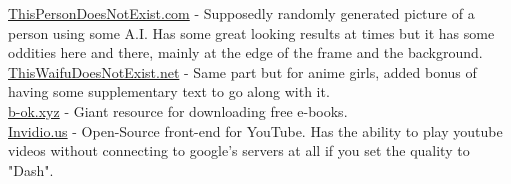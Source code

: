 \documentclass{article}
\begin{document}
\href{https://thispersondoesnotexist.com/}{ThisPersonDoesNotExist.com} - Supposedly randomly generated picture of a person using some A.I. Has some great looking results at times but it has some oddities here and there, mainly at the edge of the frame and the background.\\
\href{https://www.thiswaifudoesnotexist.net/}{ThisWaifuDoesNotExist.net} - Same part but for anime girls, added bonus of having some supplementary text to go along with it.\\
\href{https://b-ok.xyz/}{b-ok.xyz} - Giant resource for downloading free e-books.\\
\href{https://invidio.us/}{Invidio.us} - Open-Source front-end for YouTube. Has the ability to play youtube videos without connecting to google's servers at all if you set the quality to "Dash".
\end{document}
